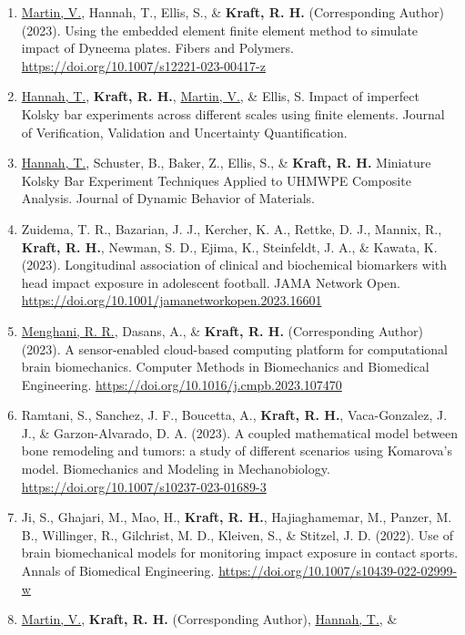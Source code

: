 \documentclass[a4paper,10pt]{article}
\begin{document}
\begin{enumerate}
\def\labelenumi{\arabic{enumi}.}
  \item	\underline{Martin, V.}, Hannah, T., Ellis, S., \&
 \textbf{\textbf{Kraft,} R. H.} (Corresponding Author) (2023). Using the embedded element finite element method to simulate impact of Dyneema plates. Fibers and Polymers. \url{https://doi.org/10.1007/s12221-023-00417-z}
  \item	\underline{Hannah, T.}, \textbf{\textbf{Kraft,} R. H.}, \underline{Martin, V.}, \&
 Ellis, S. Impact of imperfect Kolsky bar experiments across different scales using finite elements. Journal of Verification, Validation and Uncertainty Quantification.
  \item	\underline{Hannah, T.}, Schuster, B., Baker, Z., Ellis, S., \&
 \textbf{\textbf{Kraft,} R. H.} Miniature Kolsky Bar Experiment Techniques Applied to UHMWPE Composite Analysis. Journal of Dynamic Behavior of Materials.
  \item	Zuidema, T. R., Bazarian, J. J., Kercher, K. A., Rettke, D. J., Mannix, R., \textbf{\textbf{Kraft,} R. H.}, Newman, S. D., Ejima, K., Steinfeldt, J. A., \&
 Kawata, K. (2023). Longitudinal association of clinical and biochemical biomarkers with head impact exposure in adolescent football. JAMA Network Open. \url{https://doi.org/10.1001/jamanetworkopen.2023.16601}
  \item	\underline{Menghani, R. R.}, Dasans, A., \&
 \textbf{\textbf{Kraft,} R. H.} (Corresponding Author) (2023). A sensor-enabled cloud-based computing platform for computational brain biomechanics. Computer Methods in Biomechanics and Biomedical Engineering. \url{https://doi.org/10.1016/j.cmpb.2023.107470}
  \item	Ramtani, S., Sanchez, J. F., Boucetta, A., \textbf{\textbf{Kraft,} R. H.}, Vaca-Gonzalez, J. J., \&
 Garzon-Alvarado, D. A. (2023). A coupled mathematical model between bone remodeling and tumors: a study of different scenarios using Komarova's model. Biomechanics and Modeling in Mechanobiology. \url{https://doi.org/10.1007/s10237-023-01689-3}
  \item	Ji, S., Ghajari, M., Mao, H., \textbf{\textbf{Kraft,} R. H.}, Hajiaghamemar, M., Panzer, M. B., Willinger, R., Gilchrist, M. D., Kleiven, S., \&
 Stitzel, J. D. (2022). Use of brain biomechanical models for monitoring impact exposure in contact sports. Annals of Biomedical Engineering. \url{https://doi.org/10.1007/s10439-022-02999-w}
  \item	\underline{Martin, V.}, \textbf{\textbf{Kraft,} R. H.} (Corresponding Author), \underline{Hannah, T.}, \&

\end{enumerate}
\end{document}
